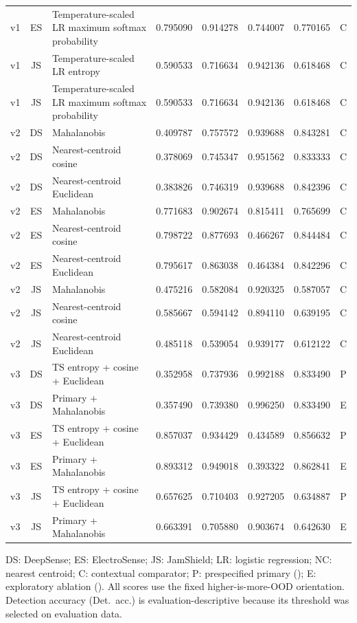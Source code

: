 \begin{table}[!t]
\begin{tabularx}{\textwidth}{@{}c c Y r r r r c@{}}
    v1 & ES & Temperature-scaled LR maximum softmax probability & 0.795090 & 0.914278 & 0.744007 & 0.770165 & C \\
    v1 & JS & Temperature-scaled LR entropy & 0.590533 & 0.716634 & 0.942136 & 0.618468 & C \\
    v1 & JS & Temperature-scaled LR maximum softmax probability & 0.590533 & 0.716634 & 0.942136 & 0.618468 & C \\
    \addlinespace
    v2 & DS & Mahalanobis & 0.409787 & 0.757572 & 0.939688 & 0.843281 & C \\
    v2 & DS & Nearest-centroid cosine & 0.378069 & 0.745347 & 0.951562 & 0.833333 & C \\
    v2 & DS & Nearest-centroid Euclidean & 0.383826 & 0.746319 & 0.939688 & 0.842396 & C \\
    v2 & ES & Mahalanobis & 0.771683 & 0.902674 & 0.815411 & 0.765699 & C \\
    v2 & ES & Nearest-centroid cosine & 0.798722 & 0.877693 & 0.466267 & 0.844484 & C \\
    v2 & ES & Nearest-centroid Euclidean & 0.795617 & 0.863038 & 0.464384 & 0.842296 & C \\
    v2 & JS & Mahalanobis & 0.475216 & 0.582084 & 0.920325 & 0.587057 & C \\
    v2 & JS & Nearest-centroid cosine & 0.585667 & 0.594142 & 0.894110 & 0.639195 & C \\
    v2 & JS & Nearest-centroid Euclidean & 0.485118 & 0.539054 & 0.939177 & 0.612122 & C \\
    \addlinespace
    v3 & DS & TS entropy + cosine + Euclidean & 0.352958 & 0.737936 & 0.992188 & 0.833490 & P \\
    v3 & DS & Primary + Mahalanobis & 0.357490 & 0.739380 & 0.996250 & 0.833490 & E \\
    v3 & ES & TS entropy + cosine + Euclidean & 0.857037 & 0.934429 & 0.434589 & 0.856632 & P \\
    v3 & ES & Primary + Mahalanobis & 0.893312 & 0.949018 & 0.393322 & 0.862841 & E \\
    v3 & JS & TS entropy + cosine + Euclidean & 0.657625 & 0.710403 & 0.927205 & 0.634887 & P \\
    v3 & JS & Primary + Mahalanobis & 0.663391 & 0.705880 & 0.903674 & 0.642630 & E \\
    \bottomrule
  \end{tabularx}

  \vspace{2pt}
  \parbox{\textwidth}{\raggedright
  DS: DeepSense; ES: ElectroSense; JS: JamShield; LR: logistic regression; NC: nearest centroid; C: contextual comparator; P: prespecified primary (); E: exploratory ablation (). All scores use the fixed higher-is-more-OOD orientation. Detection accuracy (Det.\ acc.) is evaluation-descriptive because its threshold was selected on evaluation data.}
\end{table}
